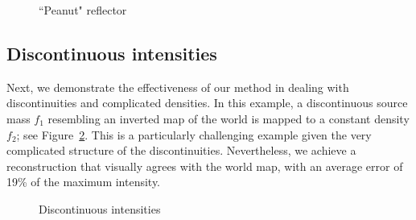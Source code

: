 \documentclass{amsart}
\theoremstyle{lemma}
\theoremstyle{remark}
\begin{document}
\begin{figure}
	\caption{``Peanut" reflector}\label{fig:peanutresult}
\end{figure}

\subsection{Discontinuous intensities}
Next, we demonstrate the effectiveness of our method in dealing with discontinuities and complicated densities. In this example, a discontinuous source mass $f_1$ resembling an inverted map of the world is mapped to a constant density $f_2$; see Figure~\ref{fig:globe}. This is a particularly challenging example given the very complicated structure of the discontinuities.  Nevertheless, we achieve a reconstruction that visually agrees with the world map, with an average error of 19\% of the maximum intensity.

\begin{figure}
	\caption{Discontinuous intensities}\label{fig:globe}
\end{figure}




\end{document}
